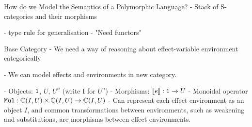 \documentclass{beamer}
\newcommand\script[1]{}
\begin{document}
\begin{frame}{How do we Model the Semantics of a Polymorphic Language?}
    - Stack of S-categories and their morphisms

    - type rule for generalisation
    - "Need functors"

\script{
    - So we can imagine a stack of these S-Categories, called fibres
    - In order to model polymorphism, we need to have ways of moving morphisms between these fibres - we need functors
}
\end{frame}

\begin{frame}{Base Category}
    - We need a way of reasoning about effect-variable environment categorically

    - We can model effects and environments in new category.

    - Objects: $\texttt{1}$, $U$, $U^n$ (write I for $U^n$)
    - Morphisms: ${\bf [\![}e{\bf ]\!]}: \texttt{1}\rightarrow U$
    - Monoidal operator $\texttt{Mul}: \mathbb{C}(I, U)\times\mathbb{C}(I, U)\rightarrow\mathbb{C}(I, U)$
    - Can represent each effect environment as an object $I$, and common transformations between environments, such as weakening and substitutions, are morphisms between effect environments.

    \script{
        - So we need a way of reasoning about the transformations of effect-variable environments in a category theoretic manner
        - To do this, we need a base category, containing a terminal object, an object $U$ representing the kind of effects, and finite products on $U$ 
        - $U^n$ represents the effect-variable environment of length $n$. We'll now use $I$ to indicate this.
        
        - Since all the ground effects have morphisms in this category, we can construct morphisms for substitutions and weakenings of the effect environment.
    }
\end{frame}
\end{document}
